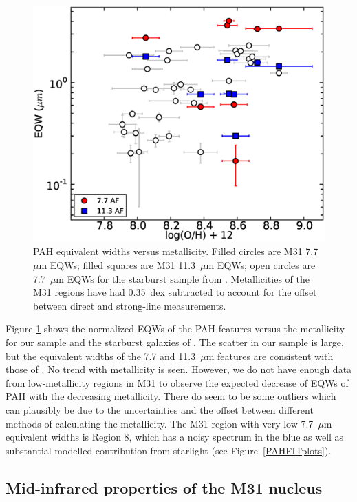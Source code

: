 \documentclass[useAMS,usenatbib,a4paper]{mn2e}
\begin{document}
\begin{figure}
\centering
\includegraphics[scale=0.27]{./fig12.eps}
\caption{ PAH equivalent widths versus metallicity. 
Filled circles are M31 7.7~$\mu$m EQWs; filled squares are M31 11.3~$\mu$m EQWs; 
open circles are 7.7~$\mu$m EQWs for the starburst sample from \citet{Engelbracht_2008}.
Metallicities of the M31 regions have had 0.35~dex subtracted to account for the offset  between direct and strong-line measurements. 
}
\label{metalicityVseqw}
\end{figure}

Figure \ref{metalicityVseqw} shows the normalized EQWs of the PAH features  versus the metallicity for our sample and the starburst 
galaxies of \citet{Engelbracht_2008}. The scatter in our sample is large, but the 	
equivalent widths of the 7.7 and 11.3~$\mu$m features are consistent with those of \citet{Engelbracht_2008}. 
No trend with metallicity is seen.
However, we do not have enough data from low-metallicity regions in M31 to observe the expected decrease of EQWs of PAH with the decreasing 
metallicity.  There do seem to be some outliers which can plausibly be due to the uncertainties  and the offset between different methods of calculating the metallicity.  
The M31 region with very low  7.7~$\mu$m  equivalent widths is Region 8, which has
a noisy spectrum in the blue as well as substantial modelled contribution from starlight (see Figure~\ref{PAHFITplots}).



\subsection{Mid-infrared properties of the M31 nucleus}
\label{sect:nucleus}
\end{document}
